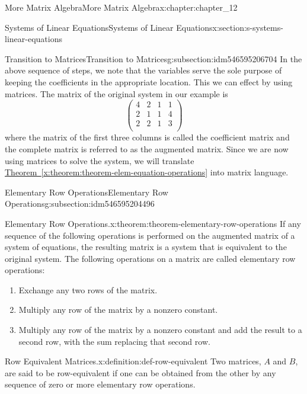\documentclass[oneside,10pt,]{book}
\newcommand{\xreffont}{\relax}
\numberwithin{equation}{section}
\begin{document}
\begin{chapterptx}{More Matrix Algebra}{}{More Matrix Algebra}{}{}{x:chapter:chapter_12}
\begin{sectionptx}{Systems of Linear Equations}{}{Systems of Linear Equations}{}{}{x:section:s-systems-linear-equations}
\begin{subsectionptx}{Transition to Matrices}{}{Transition to Matrices}{}{}{g:subsection:idm546595206704}
In the above sequence of steps, we note that the variables serve the sole purpose of keeping the coefficients in the appropriate location. This we can effect by using matrices. The matrix of the  original system in our example is%
\begin{equation*}
\left(
\begin{array}{ccc|c}
4 & 2 & 1 & 1 \\
2 & 1 & 1 & 4 \\
2 & 2 & 1 & 3 \\
\end{array}
\right)
\end{equation*}
where the matrix of the first three columns is called the coefficient matrix and the complete matrix is referred to as the augmented matrix. Since we are now using matrices to solve the system, we will translate \hyperref[x:theorem:theorem-elem-equation-operations]{Theorem~{\xreffont\ref{x:theorem:theorem-elem-equation-operations}}} into matrix language.%
\end{subsectionptx}
%
%
\typeout{************************************************}
\typeout{************************************************}
%
\begin{subsectionptx}{Elementary Row Operations}{}{Elementary Row Operations}{}{}{g:subsection:idm546595204496}
\begin{theorem}{Elementary Row Operations.}{}{x:theorem:theorem-elementary-row-operations}%
%
If any sequence of the following operations is performed on the augmented matrix of a system of equations, the resulting matrix is a system that is equivalent to the original system. The following operations on a matrix are called elementary row operations:%
\begin{enumerate}[label=(\arabic*)]
\item{}Exchange any two rows of the matrix.%
\item{}Multiply any row of the matrix by a nonzero constant.%
\item{}Multiply any row of the matrix by a nonzero constant and add the result to a second row, with the sum replacing that second row.%
\end{enumerate}
%
\end{theorem}
\begin{definition}{Row Equivalent Matrices.}{x:definition:def-row-equivalent}%
%
Two matrices, \(A\) and \(B\), are said to be row-equivalent if one can be obtained from the other by  any sequence of zero or more elementary row operations.%

\end{definition}
\end{subsectionptx}
\end{sectionptx}
\end{chapterptx}
\end{document}
